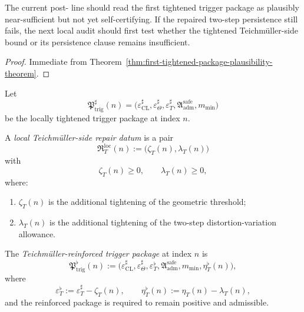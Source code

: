 \begin{corollary}
\label{cor:current-post-r22-tightened-package-reading}
The current post- line should read the first tightened trigger package as plausibly near-sufficient but not yet self-certifying.
If the repaired two-step persistence still fails, the next local audit should first test whether the tightened Teichm\"uller-side bound or its persistence clause remains insufficient.
\end{corollary}

\begin{proof}
Immediate from Theorem~\ref{thm:first-tightened-package-plausibility-theorem}.
\end{proof}



\begin{definition}\label{def:local-teichmueller-side-repair-datum}
Let
\[
\mathfrak{P}_{\mathrm{trig}}^{\sharp}(n)
=
\bigl(
\varepsilon_{\mathrm{CL}}^{\sharp},
\varepsilon_{\Theta}^{\sharp},
\varepsilon_T^{\sharp},
\mathfrak{A}_{\mathrm{adm}}^{\mathrm{safe}},
 m_{\min}
\bigr)
\]
be the locally tightened trigger package at index $n$.

A \emph{local Teichm\"uller-side repair datum} is a pair
\[
\mathfrak{R}_{T}^{\mathrm{loc}}(n)
:=
\bigl(
\zeta_T(n),
\lambda_T(n)
\bigr)
\]
with
\[
\zeta_T(n)\ge 0,
\qquad
\lambda_T(n)\ge 0,
\]
where:
\begin{enumerate}
 \item $\zeta_T(n)$ is the additional tightening of the geometric threshold;
 \item $\lambda_T(n)$ is the additional tightening of the two-step distortion-variation allowance.
\end{enumerate}
\end{definition}

\begin{definition}\label{def:teichmueller-reinforced-trigger-package}
The \emph{Teichm\"uller-reinforced trigger package} at index $n$ is
\[
\mathfrak{P}_{\mathrm{trig}}^{\flat}(n)
:=
\bigl(
\varepsilon_{\mathrm{CL}}^{\sharp},
\varepsilon_{\Theta}^{\sharp},
\varepsilon_T^{\flat},
\mathfrak{A}_{\mathrm{adm}}^{\mathrm{safe}},
 m_{\min},
 \eta_T^{\flat}(n)
\bigr),
\]
where
\[
\varepsilon_T^{\flat}
:=
\varepsilon_T^{\sharp}-\zeta_T(n),
\qquad
\eta_T^{\flat}(n)
:=
\eta_T(n)-\lambda_T(n),
\]
and the reinforced package is required to remain positive and admissible.
\end{definition}

